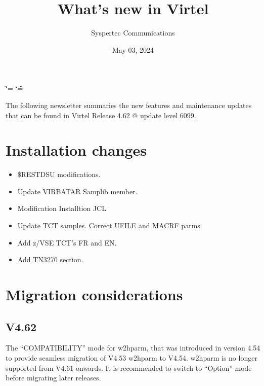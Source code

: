 \documentclass[letterpaper,10pt,english]{sphinxmanual}
\title{What's new in Virtel}
\date{May 03, 2024}
\author{Syspertec Communications}
\begin{document}
\ifdefined\shorthandoff
  \ifnum\catcode`\=\string=\active\shorthandoff{=}\fi
  \ifnum\catcode`\"=\active{}\fi
\fi

\pagestyle{empty}
\sphinxmaketitle
\pagestyle{plain}
\sphinxtableofcontents
\pagestyle{normal}
\label{\detokenize{TN202403::doc}}


\sphinxAtStartPar
The following newsletter summaries the new features and maintenance updates that can be found in Virtel Release 4.62 @ update level 6099.


\chapter{Installation changes}
\label{\detokenize{TN202403:installation-changes}}\begin{itemize}
\item {} 
 \$RESTDSU modifications.

\item {} 
 Update VIRBATAR Samplib member.

\item {} 
 Modification Installtion JCL

\item {} 
 Update TCT samples. Correct UFILE and MACRF parms.

\item {} 
 Add z/VSE TCT’s FR and EN.

\item {} 
 Add TN3270 section.

\end{itemize}


\chapter{Migration considerations}
\label{\detokenize{TN202403:migration-considerations}}

\section{V4.62}
\label{\detokenize{TN202403:v4-62}}
\sphinxAtStartPar
{}

\sphinxAtStartPar
The “COMPATIBILITY” mode for w2hparm, that was introduced in version 4.54 to provide seamless migration of V4.53 w2hparm to V4.54. w2hparm is no longer supported from V4.61 onwards. It is recommended to switch to “Option” mode before migrating later releases.
\end{document}
